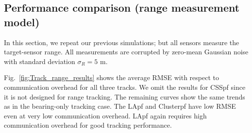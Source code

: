 \documentclass[10pt,letterpaper,final]{article}
\begin{document}
\subsection{Performance comparison (range measurement model)}
In this section, we repeat our previous simulations; but all sensors measure the target-sensor range. All measurements are corrupted by zero-mean Gaussian noise with standard deviation $\sigma_{R}=5$ m. 

Fig.~\ref{fig:Track_range_results} shows the average RMSE with respect to communication overhead for all three tracks. We omit the results for CSSpf since it is not designed for range tracking. The remaining curves show the same trends as in the bearing-only tracking case. The LApf and Clusterpf have low RMSE even at very low communication overhead. LApf again requires high communication overhead for good tracking performance. 
\end{document}

